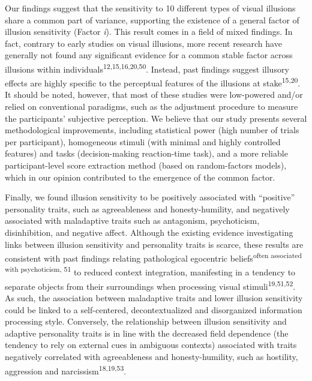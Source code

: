 \documentclass[
  man,floatsintext]{apa6}
\begin{document}
Our findings suggest that the sensitivity to 10 different types of visual illusions share a common part of variance, supporting the existence of a general factor of illusion sensitivity (Factor \emph{i}). This result comes in a field of mixed findings. In fact, contrary to early studies on visual illusions, more recent research have generally not found any significant evidence for a common stable factor across illusions within individuals\textsuperscript{12,15,16,20,50}. Instead, past findings suggest illusory effects are highly specific to the perceptual features of the illusions at stake\textsuperscript{15,20}. It should be noted, however, that most of these studies were low-powered and/or relied on conventional paradigms, such as the adjustment procedure to measure the participants' subjective perception. We believe that our study presents several methodological improvements, including statistical power (high number of trials per participant), homogeneous stimuli (with minimal and highly controlled features) and tasks (decision-making reaction-time task), and a more reliable participant-level score extraction method (based on random-factors models), which in our opinion contributed to the emergence of the common factor.

Finally, we found illusion sensitivity to be positively associated with ``positive'' personality traits, such as agreeableness and honesty-humility, and negatively associated with maladaptive traits such as antagonism, psychoticism, disinhibition, and negative affect. Although the existing evidence investigating links between illusion sensitivity and personality traits is scarce, these results are consistent with past findings relating pathological egocentric beliefs\textsuperscript{often associated with psychoticism, 51} to reduced context integration, manifesting in a tendency to separate objects from their surroundings when processing visual stimuli\textsuperscript{19,51,52}. As such, the association between maladaptive traits and lower illusion sensitivity could be linked to a self-centered, decontextualized and disorganized information processing style. Conversely, the relationship between illusion sensitivity and adaptive personality traits is in line with the decreased field dependence (the tendency to rely on external cues in ambiguous contexts) associated with traits negatively correlated with agreeableness and honesty-humility, such as hostility, aggression and narcissism\textsuperscript{18,19,53}.
\end{document}
